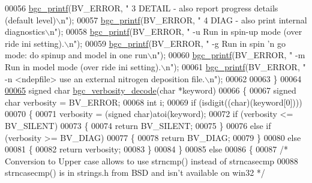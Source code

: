 \begin{DoxyCode}
{00056     \hyperlink{bgc__io_8c_af287cce6e2aede1ce337de9319e80d0d}{bgc\_printf}(BV\_ERROR, \textcolor{stringliteral}{"           3 DETAIL - also report progress details (default level)\(\backslash\)n"});
00057     \hyperlink{bgc__io_8c_af287cce6e2aede1ce337de9319e80d0d}{bgc\_printf}(BV\_ERROR, \textcolor{stringliteral}{"           4 DIAG - also print internal diagnostics\(\backslash\)n"});
00058     \hyperlink{bgc__io_8c_af287cce6e2aede1ce337de9319e80d0d}{bgc\_printf}(BV\_ERROR, \textcolor{stringliteral}{"       -u Run in spin-up mode (over ride ini setting).\(\backslash\)n"});
00059     \hyperlink{bgc__io_8c_af287cce6e2aede1ce337de9319e80d0d}{bgc\_printf}(BV\_ERROR, \textcolor{stringliteral}{"       -g Run in spin 'n go mode: do spinup and model in one run\(\backslash\)n"});
00060     \hyperlink{bgc__io_8c_af287cce6e2aede1ce337de9319e80d0d}{bgc\_printf}(BV\_ERROR, \textcolor{stringliteral}{"       -m Run in model mode (over ride ini setting).\(\backslash\)n"});
00061     \hyperlink{bgc__io_8c_af287cce6e2aede1ce337de9319e80d0d}{bgc\_printf}(BV\_ERROR, \textcolor{stringliteral}{"       -n <ndepfile> use an external nitrogen deposition file.\(\backslash\)n"});
00062 
00063 \}
00064 
\hypertarget{bgc__io_8c_source_l00065}{}\hyperlink{bgc__io_8c_a7e5b7887ea15ba8d15033332d71ccc98}{00065} \textcolor{keywordtype}{signed} \textcolor{keywordtype}{char} \hyperlink{bgc__io_8c_a7e5b7887ea15ba8d15033332d71ccc98}{bgc\_verbosity\_decode}(\textcolor{keywordtype}{char} *keyword)
00066 \{
00067     \textcolor{keywordtype}{signed} \textcolor{keywordtype}{char} verbosity = BV\_ERROR;
00068     \textcolor{keywordtype}{int} i; 
00069     \textcolor{keywordflow}{if} (isdigit((\textcolor{keywordtype}{char})(keyword[0])))
00070     \{
00071         verbosity = (\textcolor{keywordtype}{signed} char)atoi(keyword);
00072         \textcolor{keywordflow}{if} (verbosity <= BV\_SILENT)
00073         \{
00074             \textcolor{keywordflow}{return} BV\_SILENT;
00075         \}
00076         \textcolor{keywordflow}{else} \textcolor{keywordflow}{if} (verbosity >= BV\_DIAG)
00077         \{
00078             \textcolor{keywordflow}{return} BV\_DIAG;
00079         \}
00080         \textcolor{keywordflow}{else}
00081         \{
00082             \textcolor{keywordflow}{return} verbosity;
00083         \}
00084     \}
00085     \textcolor{keywordflow}{else}
00086     \{
00087         \textcolor{comment}{/*  Conversion to Upper case allows to use strncmp() instead of strncasecmp }
00088 \textcolor{comment}{                strncasecmp() is in strings.h from BSD and isn't available on win32 */}
}
\end{DoxyCode}

